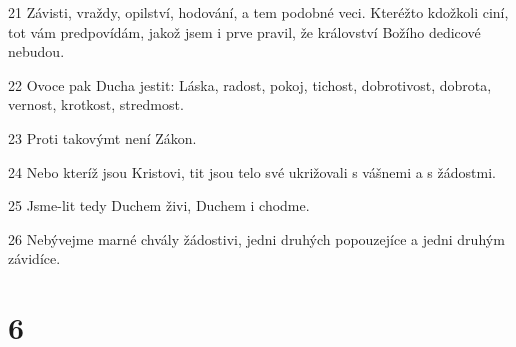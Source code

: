 \par 21 Závisti, vraždy, opilství, hodování, a tem podobné veci. Kteréžto kdožkoli ciní, tot vám predpovídám, jakož jsem i prve pravil, že království Božího dedicové nebudou.
\par 22 Ovoce pak Ducha jestit: Láska, radost, pokoj, tichost, dobrotivost, dobrota, vernost, krotkost, stredmost.
\par 23 Proti takovýmt není Zákon.
\par 24 Nebo kteríž jsou Kristovi, tit jsou telo své ukrižovali s vášnemi a s žádostmi.
\par 25 Jsme-lit tedy Duchem živi, Duchem i chodme.
\par 26 Nebývejme marné chvály žádostivi, jedni druhých popouzejíce a jedni druhým závidíce.

\chapter{6}

